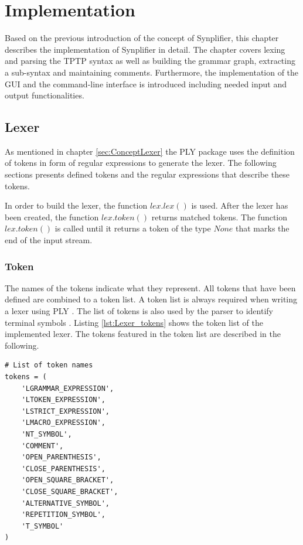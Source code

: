 
\chapter{Implementation}\label{cha:Implementation}

Based on the previous introduction of the concept of Synplifier, this chapter describes the implementation of Synplifier in detail. The chapter covers lexing and parsing the \ac{TPTP} syntax as well as building the grammar graph, extracting a sub-syntax and maintaining comments.
Furthermore, the implementation of the GUI and the command-line interface is introduced including needed input and output functionalities.

\section{Lexer}\label{sec:ImplementationLexer}

As mentioned in chapter \ref{sec:ConceptLexer} the \ac{PLY} package uses the definition of tokens in form of regular expressions to generate the lexer. The following sections presents defined tokens and the regular expressions that describe these tokens.

In order to build the lexer, the function $lex.lex()$ is used. After the lexer has been created, the function $lex.token()$ returns matched tokens. The function $lex.token()$ is called until it returns a token of the type $None$ that marks the end of the input stream. 

\subsection{Token}\label{sec:ImplementationLexerToken}

The names of the tokens indicate what they represent. 
All tokens that have been defined are combined to a token list.
A token list is always required when writing a lexer using \ac{PLY} \cite{PLY}.
The list of tokens is also used by the parser to identify terminal symbols \cite{PLY}.
Listing \ref{lst:Lexer_tokens} shows the token list of the implemented lexer.
The tokens featured in the token list are described in the following.\\

\begin{lstlisting}[language=None,basicstyle=\scriptsize	,caption= Lexer tokens,label= lst:Lexer_tokens]
# List of token names
tokens = (
    'LGRAMMAR_EXPRESSION',
    'LTOKEN_EXPRESSION',
    'LSTRICT_EXPRESSION',
    'LMACRO_EXPRESSION',
    'NT_SYMBOL',
    'COMMENT',
    'OPEN_PARENTHESIS',
    'CLOSE_PARENTHESIS',
    'OPEN_SQUARE_BRACKET',
    'CLOSE_SQUARE_BRACKET',
    'ALTERNATIVE_SYMBOL',
    'REPETITION_SYMBOL',
    'T_SYMBOL'
)
\end{lstlisting}

